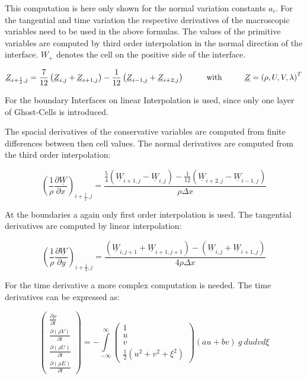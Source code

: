 \documentclass[
	pdftex,             %
	12pt,				%
	a4paper,		   	%
	english,				%
	oneside,			%
]{article}
\newcommand{\uu}[1]{\underline{#1}}
\begin{document}
This computation is here only shown for the normal variation constants $a_i$. For the tangential and time variation the respective derivatives of the macroscopic variables need to be used in the above formulas. The values of the primitive variables are computed by third order interpolation in the normal direction of the interface. $W_{+}$ denotes the cell on the positive side of the interface.

\begin{equation}
\uu{Z}_{i+\frac{1}{2},j} 
= \dfrac{7}{12} \left( \uu{Z}_{i,j} + \uu{Z}_{i+1,j} \right)
- \dfrac{1}{12} \left( \uu{Z}_{i-1,j} + \uu{Z}_{i+2,j} \right)
\hspace{1cm} \textnormal{with} \hspace{1cm}
\uu{Z} = \left( \rho, U, V, \lambda \right)^T
\end{equation}

For the boundary Interfaces on linear Interpolation is used, since only one layer of Ghost-Cells is introduced.

The spacial derivatives of the conservative variables are computed from finite differences between then cell values. The normal derivatives are computed from the third order interpolation:

\begin{equation}
\left( \dfrac{1}{\rho}\dfrac{\partial \uu{W}}{\partial x} \right)_{i+\frac{1}{2},j}
= \dfrac{\frac{5}{4}  \left( \uu{W}_{i+1,j} - \uu{W}_{i,j} \right) 
       - \frac{1}{12} \left( \uu{W}_{i+2,j} - \uu{W}_{i-1,j} \right)}{\rho \Delta x}
\end{equation}

At the boundaries a again only first order interpolation is used. The tangential derivatives are computed by linear interpolation:

\begin{equation}
\left( \dfrac{1}{\rho}\dfrac{\partial \uu{W}}{\partial y} \right)_{i+\frac{1}{2},j}
= \dfrac{\left( \uu{W}_{i,j+1} + \uu{W}_{i+1,j+1} \right)
       - \left( \uu{W}_{i,j}   + \uu{W}_{i+1,j}   \right) }{4 \rho \Delta x}
\end{equation}

For the time derivative a more complex computation is needed. The time derivatives can be expressed as:

\begin{equation}
\begin{pmatrix}
	\frac{\partial \rho    }{\partial t} \\
	\frac{\partial (\rho V)}{\partial t} \\
	\frac{\partial (\rho U)}{\partial t} \\
	\frac{\partial (\rho E)}{\partial t}
\end{pmatrix}
 =
-%
\int \limits^{\infty}_{-\infty}
\begin{pmatrix}
	1 \\
	u \\
	v \\
	\frac{1}{2} ( u^2 + v^2 + \xi^2 )
\end{pmatrix}
(a u + b v) ~g~
du dv d\xi
\end{equation}
\end{document}
